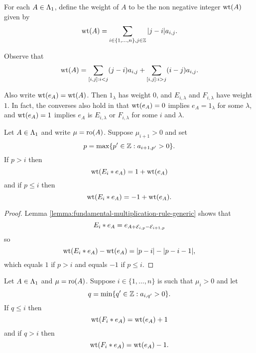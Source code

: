 \documentclass[a4paper, 11pt]{report}
\begin{document}
\begin{definition}\label{def:weight-of-matrix}
For each $A\in\Lambda_1{}$, define the weight of $A$ to be the non negative integer $\operatorname{wt}(A)$ given by
\begin{equation*}
\operatorname{wt}(A) = \sum_{i\in\{1,\ldots,n\},j\in\mathbb{Z}} |j-i| a_{i,j}.
\end{equation*}
\end{definition}

Observe that
\begin{equation*}
\operatorname{wt}(A) = \sum_{[i,j]:i<j}(j-i)a_{i,j} + \sum_{[i,j]:i>j}(i-j)a_{i,j}.
\end{equation*}

Also write $\operatorname{wt}(e_A) = \operatorname{wt}(A)$. Then $1_\lambda$ has weight $0$, and $E_{i,\lambda}$ and $F_{i,\lambda}$ have weight $1$. In fact, the converses also hold in that $\operatorname{wt}(e_A)=0$ implies $e_A=1_\lambda$ for some $\lambda$, and $\operatorname{wt}(e_A)=1$ implies $e_A$ is $E_{i,\lambda}$ or $F_{i,\lambda}$ for some $i$ and $\lambda$.

\begin{lemma}\label{lemma:weight-change-E}
Let $A\in\Lambda_1{}$ and write $\mu=\operatorname{ro}(A)$. Suppose $\mu_{i+1}>0$ and set
\begin{equation*}
p=\max\{p'\in\mathbb{Z}: a_{i+1,p'}>0\}.
\end{equation*}
If $p>i$ then
\begin{equation*}
\operatorname{wt}(E_i\ast e_A)=1+\operatorname{wt}(e_A)
\end{equation*}
and if $p\le i$ then
\begin{equation*}
\operatorname{wt}(E_i\ast e_A)=-1+\operatorname{wt}(e_A).
\end{equation*}
\end{lemma}

\begin{proof}
Lemma \ref{lemma:fundamental-multiplication-rule-generic} shows that
\begin{equation*}
E_i\ast e_A = e_{A+\mathcal{E}_{i,p}-\mathcal{E}_{i+1,p}}
\end{equation*}
so
\begin{equation*}
\operatorname{wt}(E_i\ast e_A) - \operatorname{wt}(e_A) = |p-i| - |p-i-1|,
\end{equation*}
which equals $1$ if $p>i$ and equals $-1$ if $p\le i$.
\end{proof}

\begin{lemma}\label{lemma:weight-change-F}
Let $A\in\Lambda_1{}$ and $\mu=\operatorname{ro}(A)$. Suppose $i\in\{1,\ldots,n\}$ is such that $\mu_i>0$ and let
\begin{equation*}
q = \min\{q'\in\mathbb{Z}:a_{i,q'}>0\}.
\end{equation*}
If $q\le i$ then
\begin{equation*}
\operatorname{wt}(F_i\ast e_A) = \operatorname{wt}(e_A) + 1
\end{equation*}
and if $q>i$ then
\begin{equation*}
\operatorname{wt}(F_i\ast e_A) = \operatorname{wt}(e_A) - 1.
\end{equation*}
\end{lemma}
\end{document}
